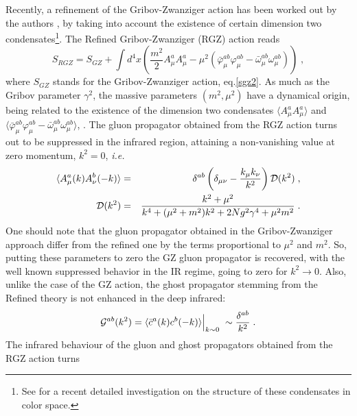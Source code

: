 Recently, a refinement of the Gribov-Zwanziger action has been worked out by the authors
\cite{Dudal:2007cw,Dudal:2008sp,Dudal:2011gd,Dudal:2008rm}, by taking into account the existence of certain
dimension two condensates\footnote{See \cite{Gracey:2010cg,Thelan:2014mza} for a recent
detailed investigation on  the structure of these condensates in color space.}.  The Refined
Gribov-Zwanziger (RGZ) action reads \cite{Dudal:2007cw,Dudal:2008sp,Dudal:2011gd,Dudal:2008rm}
\begin{equation}
S_{RGZ} = S_{GZ} + \int d^4x \left(  \frac{m^2}{2} A^a_\mu A^a_\mu  - \mu^2 \left( {\bar
\varphi}^{ab}_{\mu}  { \varphi}^{ab}_{\mu} -  {\bar \omega}^{ab}_{\mu}  { \omega}^{ab}_{\mu}
\right)   \right)  \;,  
\label{rgz}
\end{equation}
where $S_{GZ}$ stands for the Gribov-Zwanziger action,  eq.\eqref{sgz2}.  As much as the Gribov
parameter $\gamma^2$, the massive parameters $(m^2, \mu^2)$ have a dynamical origin, being
related to the existence of the dimension two condensates $\langle A^a_\mu A^a_\mu \rangle$ and
$\langle {\bar \varphi}^{ab}_{\mu}  { \varphi}^{ab}_{\mu} -  {\bar \omega}^{ab}_{\mu}  {
\omega}^{ab}_{\mu}  \rangle$, \cite{Dudal:2007cw,Dudal:2008sp,Dudal:2011gd,Dudal:2008rm}. 
The gluon propagator obtained from the RGZ action turns out to be suppressed in the infrared region, attaining a non-vanishing value at zero momentum, $k^2=0$, {\it i.e.}
\begin{eqnarray} 
\langle  A^a_\mu(k)  A^b_\nu(-k) \rangle  & = &  \delta^{ab}  \left(\delta_{\mu\nu} - \frac{k_\mu k_\nu}{k^2}     \right)   {\cal D}(k^2) \;, \label{glrgz} \\
{\cal D}(k^2) & = & \frac{k^2 +\mu^2}{k^4 + (\mu^2+m^2)k^2 + 2Ng^2\gamma^4 + \mu^2 m^2}  \;. \label{Dg}
\end{eqnarray} 
One should note that the gluon propagator obtained in the Gribov-Zwanziger approach differ from
the refined one by the terms proportional to $\mu^{2}$ and $m^{2}$. So, putting these
parameters to zero the GZ gluon propagator is recovered, with the well known suppressed
behavior in the IR regime, going to zero for $k^{2} \to 0$.
Also, unlike the case of the GZ action, the ghost propagator stemming from the Refined theory is not enhanced in the deep infrared:
\begin{equation}
{\cal G}^{ab}(k^2) = \langle  {\bar c}^{a} (k)  c^b(-k) \rangle \Big|_{k\sim 0} \; \sim \frac{\delta^{ab}}{k^2}   \;.\label{ghrgz} 
\end{equation}
The infrared behaviour of the  gluon and ghost propagators obtained from the RGZ  action turns
